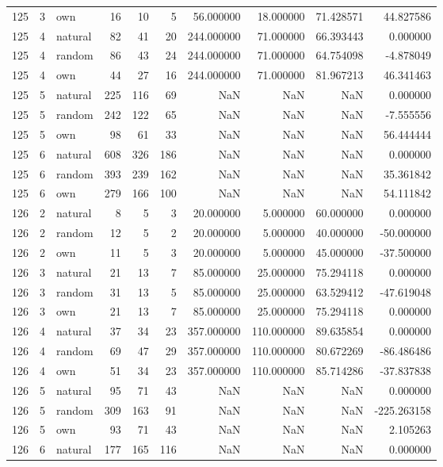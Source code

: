 \begin{table}[htbp]
\begin{tabular}{rrlrrrrrrr}
125 & 3 & own & 16 & 10 & 5 & 56.000000 & 18.000000 & 71.428571 & 44.827586 \\
125 & 4 & natural & 82 & 41 & 20 & 244.000000 & 71.000000 & 66.393443 & 0.000000 \\
125 & 4 & random & 86 & 43 & 24 & 244.000000 & 71.000000 & 64.754098 & -4.878049 \\
125 & 4 & own & 44 & 27 & 16 & 244.000000 & 71.000000 & 81.967213 & 46.341463 \\
125 & 5 & natural & 225 & 116 & 69 & NaN & NaN & NaN & 0.000000 \\
125 & 5 & random & 242 & 122 & 65 & NaN & NaN & NaN & -7.555556 \\
125 & 5 & own & 98 & 61 & 33 & NaN & NaN & NaN & 56.444444 \\
125 & 6 & natural & 608 & 326 & 186 & NaN & NaN & NaN & 0.000000 \\
125 & 6 & random & 393 & 239 & 162 & NaN & NaN & NaN & 35.361842 \\
125 & 6 & own & 279 & 166 & 100 & NaN & NaN & NaN & 54.111842 \\
126 & 2 & natural & 8 & 5 & 3 & 20.000000 & 5.000000 & 60.000000 & 0.000000 \\
126 & 2 & random & 12 & 5 & 2 & 20.000000 & 5.000000 & 40.000000 & -50.000000 \\
126 & 2 & own & 11 & 5 & 3 & 20.000000 & 5.000000 & 45.000000 & -37.500000 \\
126 & 3 & natural & 21 & 13 & 7 & 85.000000 & 25.000000 & 75.294118 & 0.000000 \\
126 & 3 & random & 31 & 13 & 5 & 85.000000 & 25.000000 & 63.529412 & -47.619048 \\
126 & 3 & own & 21 & 13 & 7 & 85.000000 & 25.000000 & 75.294118 & 0.000000 \\
126 & 4 & natural & 37 & 34 & 23 & 357.000000 & 110.000000 & 89.635854 & 0.000000 \\
126 & 4 & random & 69 & 47 & 29 & 357.000000 & 110.000000 & 80.672269 & -86.486486 \\
126 & 4 & own & 51 & 34 & 23 & 357.000000 & 110.000000 & 85.714286 & -37.837838 \\
126 & 5 & natural & 95 & 71 & 43 & NaN & NaN & NaN & 0.000000 \\
126 & 5 & random & 309 & 163 & 91 & NaN & NaN & NaN & -225.263158 \\
126 & 5 & own & 93 & 71 & 43 & NaN & NaN & NaN & 2.105263 \\
126 & 6 & natural & 177 & 165 & 116 & NaN & NaN & NaN & 0.000000 \\

\end{tabular}
\end{table}
